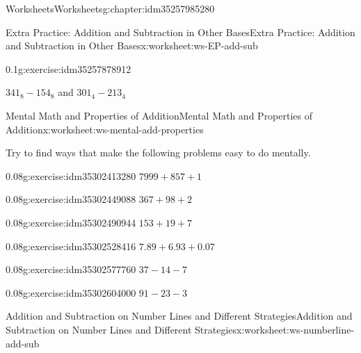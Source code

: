 \documentclass[twoside,11pt,]{book}
\begin{document}
\begin{chapterptx}{Worksheets}{}{Worksheets}{}{}{g:chapter:idm35257985280}
\begin{worksheet-section-numberless}{Extra Practice: Addition and Subtraction in Other Bases}{}{Extra Practice: Addition and Subtraction in Other Bases}{}{}{x:worksheet:ws-EP-add-sub}
\begin{divisionexercise}{2}{}{0.1}{g:exercise:idm35257878912}
\par
\(341_8 - 154_8 \) and \(301_4 -213_4\)%
\end{divisionexercise}%
\end{worksheet-section-numberless}
\restoregeometry
%
%
\typeout{************************************************}
\typeout{************************************************}
%
\begin{worksheet-section-numberless}{Mental Math and Properties of Addition}{}{Mental Math and Properties of Addition}{}{}{x:worksheet:ws-mental-add-properties}
\begin{introduction}{}%
Try to find ways that make the following problems easy to do mentally.%
\end{introduction}%
\begin{divisionexercise}{1}{}{0.08}{g:exercise:idm35302413280}%
\(7999+857+1\)%
\end{divisionexercise}%
\begin{divisionexercise}{2}{}{0.08}{g:exercise:idm35302449088}%
\(367+98+2\)%
\end{divisionexercise}%
\begin{divisionexercise}{3}{}{0.08}{g:exercise:idm35302490944}%
\(153+19+7\)%
\end{divisionexercise}%
\begin{divisionexercise}{4}{}{0.08}{g:exercise:idm35302528416}%
\(7.89+6.93+0.07\)%
\end{divisionexercise}%
\begin{divisionexercise}{5}{}{0.08}{g:exercise:idm35302577760}%
\(37-14-7\)%
\end{divisionexercise}%
\begin{divisionexercise}{6}{}{0.08}{g:exercise:idm35302604000}%
\(91-23-3\)%
\end{divisionexercise}%
\end{worksheet-section-numberless}
\restoregeometry
%
%
\typeout{************************************************}
\typeout{************************************************}
%
\begin{worksheet-section-numberless}{Addition and Subtraction on Number Lines and Different Strategies}{}{Addition and Subtraction on Number Lines and Different Strategies}{}{}{x:worksheet:ws-numberline-add-sub}

\end{worksheet-section-numberless}
\end{chapterptx}
\end{document}
